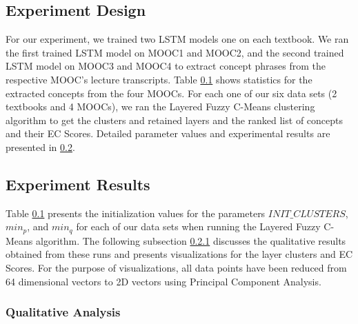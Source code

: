 
\subsection{Experiment Design}
For our experiment, we trained two LSTM models one on each textbook. We ran the first trained LSTM model on MOOC1 and MOOC2, and the second trained LSTM model on MOOC3 and MOOC4 to extract concept phrases from the respective MOOC's lecture transcripts. Table \ref{} shows statistics for the extracted concepts from the four MOOCs.
For each one of our six data sets (2 textbooks and 4 MOOCs), we ran the Layered Fuzzy C-Means clustering algorithm to get the clusters and retained layers and the ranked list of concepts and their EC Scores. Detailed parameter values and experimental results are presented in \ref{exp_results}. 

\subsection{Experiment Results}\label{exp_results}
Table \ref{} presents the initialization values for the parameters $INIT\_CLUSTERS$, $min_p$, and $min_q$ for each of our data sets when running the Layered Fuzzy C-Means algorithm. The following subsection \ref{qualitative} discusses the qualitative results obtained from these runs and presents visualizations for the layer clusters and EC Scores. For the purpose of visualizations, all data points have been reduced from 64 dimensional vectors to 2D vectors using Principal Component Analysis.

\subsubsection{Qualitative Analysis}\label{qualitative}

